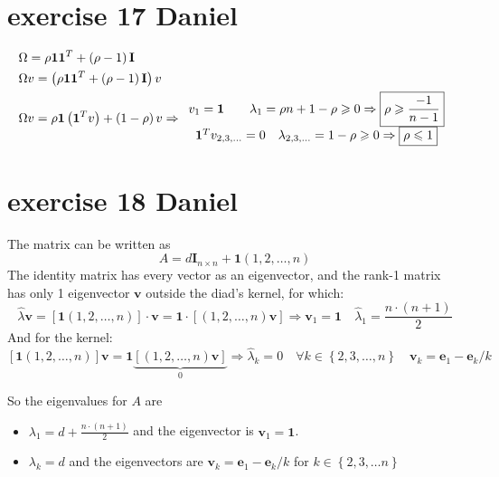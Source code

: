 \documentclass{article}
\begin{document}
\section{exercise 17 Daniel}
\[\begin{gathered}
        \Omega  = \rho {\mathbf{1}}{{\mathbf{1}}^T} + \left( {\rho  - 1} \right){\mathbf{I}} \hfill \\
        \Omega v = \left( {\rho {\mathbf{1}}{{\mathbf{1}}^T} + \left( {\rho  - 1} \right){\mathbf{I}}} \right)v \hfill \\
        \Omega v = \rho {\mathbf{1}}\left( {{{\mathbf{1}}^T}v} \right) + \left( {1 - \rho } \right)v \Rightarrow \begin{array}{*{20}{c}}
            {{v_1} = {\mathbf{1}}\qquad {\lambda _1} = \rho n + 1 - \rho  \geqslant 0 \Rightarrow \boxed{\rho  \geqslant \frac{{ - 1}}{{n - 1}}}} \\
            {{\mathbf{1}^T}{v_{2,3, \ldots }} = 0\quad {\lambda _{2,3, \ldots }} = 1 - \rho  \geqslant 0 \Rightarrow \boxed{\rho  \leqslant 1}}
        \end{array} \hfill \\
    \end{gathered} \]
\section{exercise 18 Daniel}
The matrix can be written as
\[A= d{{\mathbf{I}}_{n \times n}} + {\mathbf{1}} \left( {1,2, \ldots ,n} \right)\]
The identity matrix has every vector as an eigenvector, and the rank-1 matrix has only 1 eigenvector $\mathbf{v}$ outside the diad's kernel, for which:
\[
    \hat\lambda \mathbf{v} = \left[{\mathbf{1}} \left( {1,2, \ldots ,n} \right) \right] \cdot \mathbf{v} = {\mathbf{1}} \cdot \left[ \left( {1,2, \ldots ,n} \right) \mathbf{v}\right] \Rightarrow \mathbf{v}_1 = \mathbf{1} \quad \hat\lambda_1 = \frac{n \cdot (n+1)}{2}
\]
And for the kernel:
\[\left[ {{\mathbf{1}}\left( {1,2, \ldots ,n} \right)} \right]{\mathbf{v}} = {\mathbf{1}}\underbrace {\left[ {\left( {1,2, \ldots ,n} \right){\mathbf{v}}} \right]}_0 \Rightarrow \hat\lambda _k = 0\quad \forall k \in \left\{ {2,3, \ldots ,n} \right\}\quad {{\mathbf{v}}_k} = {{\mathbf{e}}_1} - {{\mathbf{e}}_k}/k\]

So the eigenvalues for $A$ are
\begin{itemize}
    \item $\lambda_1 = d + \frac{n \cdot (n+1)}{2}$ and the eigenvector is $\mathbf{v}_1 = \mathbf{1}$.
    \item $\lambda_k = d$ and the eigenvectors are $\mathbf{v}_k = {\mathbf{e}}_1 - {{\mathbf{e}}_k}/k$ for $k \in \left\{2, 3, \ldots n\right\}$
\end{itemize}
\end{document}
